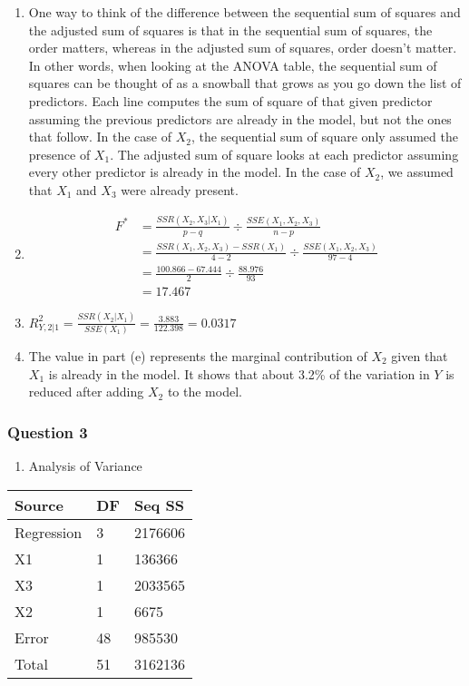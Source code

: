 \documentclass{article}
\providecommand{\tightlist}{%
      \setlength{\itemsep}{0pt}\setlength{\parskip}{0pt}}
\begin{document}
\begin{enumerate}
\def\labelenumi{\alph{enumi})}
\setcounter{enumi}{2}
\item
  One way to think of the difference between the sequential sum of
  squares and the adjusted sum of squares is that in the sequential sum
  of squares, the order matters, whereas in the adjusted sum of squares,
  order doesn't matter. In other words, when looking at the ANOVA table,
  the sequential sum of squares can be thought of as a snowball that
  grows as you go down the list of predictors. Each line computes the
  sum of square of that given predictor assuming the previous predictors
  are already in the model, but not the ones that follow. In the case of
  \(X_2\), the sequential sum of square only assumed the presence of
  \(X_1\). The adjusted sum of square looks at each predictor assuming
  every other predictor is already in the model. In the case of \(X_2\),
  we assumed that \(X_1\) and \(X_3\) were already present.
\item
  \begin{align*}
    F^* &= \frac{SSR(X_2, X_3 | X_1)}{p - q} \div \frac{SSE(X_1, X_2, X_3)}{n - p} \\
	&= \frac{SSR(X_1, X_2, X_3) - SSR(X_1)}{4 - 2} \div \frac{SSE(X_1, X_2, X_3)}{97 - 4} \\
	&= \frac{100.866 - 67.444}{2} \div \frac{88.976}{93} \\
	&= 17.467
  \end{align*}
\item
  \(R^2_{Y,2|1} = \frac{SSR(X_2 | X_1)}{SSE(X_1)} = \frac{3.883}{122.398} = 0.0317\)
\item
  The value in part (e) represents the marginal contribution of \(X_2\)
  given that \(X_1\) is already in the model. It shows that about 3.2\%
  of the variation in \(Y\) is reduced after adding \(X_2\) to the
  model.
\end{enumerate}

    \subsubsection{Question 3}\label{question-3}

\begin{enumerate}
\def\labelenumi{\alph{enumi})}
\tightlist
\item
  Analysis of Variance
\end{enumerate}

\begin{longtable}[c]{@{}lll@{}}
\toprule
Source & DF & Seq SS\tabularnewline
\midrule
\endhead
Regression & 3 & 2176606\tabularnewline
X1 & 1 & 136366\tabularnewline
X3 & 1 & 2033565\tabularnewline
X2 & 1 & 6675\tabularnewline
Error & 48 & 985530\tabularnewline
Total & 51 & 3162136\tabularnewline
\bottomrule
\end{longtable}
\end{document}
